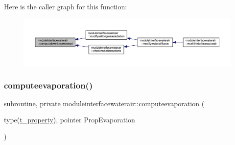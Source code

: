 Here is the caller graph for this function\+:\nopagebreak
\begin{figure}[H]
\begin{center}
\leavevmode
\includegraphics[width=350pt]{namespacemoduleinterfacewaterair_ae3df7c61e2dbd50895d272ec3bdb3d28_icgraph}
\end{center}
\end{figure}
\mbox{\label{namespacemoduleinterfacewaterair_a808beb15bad5f77afa64f469679f1229}} 
\subsubsection{\texorpdfstring{computeevaporation()}{computeevaporation()}}
{\footnotesize\ttfamily subroutine, private moduleinterfacewaterair\+::computeevaporation (\begin{DoxyParamCaption}\item[{type(\mbox{\hyperlink{structmoduleinterfacewaterair_1_1t__property}{t\+\_\+property}}), pointer}]{Prop\+Evaporation }\end{DoxyParamCaption})\hspace{0.3cm}{\ttfamily [private]}}

